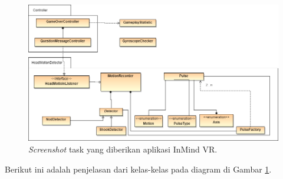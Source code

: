 \begin{figure}[htbp]
\centering
\includegraphics[scale=0.4]{Gambar/diagram-kelas-algoritma-pendeteksi-gerakan-kepala-sederhana.png}
\caption{\textit{Screenshot} task yang diberikan aplikasi InMind VR.}
\label{fig:diagram_kelas_algoritma_pendeteksi_gerakan_kepala_sederhana}
\end{figure}
Berikut ini adalah penjelasan dari kelas-kelas pada diagram di Gambar \ref{fig:diagram_kelas_algoritma_pendeteksi_gerakan_kepala_sederhana}.
